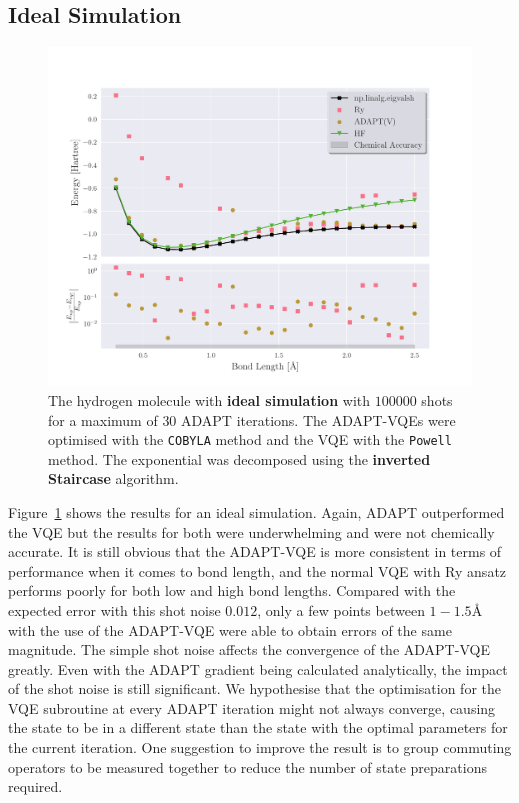 \subsection{Ideal Simulation}
\begin{figure}[ht]
    \centering
    \includegraphics[width=\linewidth]{image/h2_result/simulation/best_sim.pdf}
    \caption{The hydrogen molecule with \textbf{ideal simulation} with $ 100000 $ shots for a maximum of $ 30 $ ADAPT iterations. The ADAPT-VQEs were optimised with the \texttt{COBYLA} method and the VQE with the \texttt{Powell} method. The exponential was decomposed using the \textbf{inverted Staircase} algorithm.}
    \label{fig:h2main-noisy}
\end{figure}

Figure~\ref{fig:h2main-noisy} shows the results for an ideal simulation. Again, ADAPT outperformed the VQE but the results for both were underwhelming and were not chemically accurate. It is still obvious that the ADAPT-VQE is more consistent in terms of performance when it comes to bond length, and the normal VQE with Ry ansatz performs poorly for both low and high bond lengths. Compared with the expected error with this shot noise $ 0.012 $, only a few points between $ 1 - 1.5 \text{Å} $ with the use of the ADAPT-VQE were able to obtain errors of the same magnitude.
The simple shot noise affects the convergence of the ADAPT-VQE greatly. Even with the ADAPT gradient being calculated analytically, the impact of the shot noise is still significant. We hypothesise that the optimisation for the VQE subroutine at every ADAPT iteration might not always converge, causing the state to be in a different state than the state with the optimal parameters for the current iteration. One suggestion to improve the result is to group commuting operators to be measured together to reduce the number of state preparations required.


